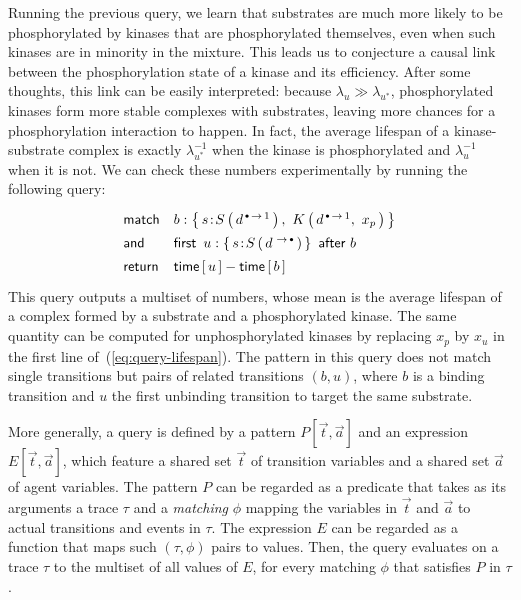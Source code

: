 \documentclass[runningheads]{llncs}
\begin{document}
Running the previous query, we learn that substrates are much more
likely to be phosphorylated by kinases that are phosphorylated
themselves, even when such kinases are in minority in the mixture.
This leads us to conjecture a causal link between the phosphorylation
state of a kinase and its efficiency. After some thoughts, this link
can be easily interpreted: because $\lambda_u \gg \lambda_{u^*}$,
phosphorylated kinases form more stable complexes with substrates,
leaving more chances for a phosphorylation interaction to happen.  In
fact, the average lifespan of a kinase-substrate complex is exactly
$\lambda_{u^*}^{-1}$ when the kinase is phosphorylated and
$\lambda_u^{-1}$ when it is not. We can check these numbers
experimentally by running the following query:
\begin{equation}\label{eq:query-lifespan}
  \Query{
    \m{match} & 
    b:\Set{ \iAG{s}{S}{d^{\Trans{\Free}{1}}}, \ 
      \AG{K}{d^{\Trans{\Free}{1}}, \ x_{p}} } \\
    \m{and} &
    \FirstAfter{u:\Set{ \iAG{s}{S}{d^{\Trans{}{\Free}}} }}{b} \\
    \m{return} & 
    \Time{u} - \Time{b}
  }
\end{equation}
This query outputs a multiset of numbers, whose mean is the average
lifespan of a complex formed by a substrate and a phosphorylated
kinase. The same quantity can be computed for unphosphorylated kinases
by replacing $x_p$ by $x_u$ in the first line
of~(\ref{eq:query-lifespan}).  The pattern in this query does not
match single transitions but pairs of related transitions $(b, u)$,
where $b$ is a binding transition and $u$ the first unbinding
transition to target the same substrate.

\iffalse
\begin{equation}\label{eq:query-kinase-efficiency}
  \Query{
    \m{match} & 
    b:\Set{ \iAG{s}{S}{x_u,\ d^{\Trans{\Free}{1}}}, \ 
      \iAG{k}{K}{d^{\Trans{\Free}{1}}} } \\
    \m{and} &
    \FirstAfter{u:\Set{ \iAG{s}{S}{d^{\Trans{}{\Free}}} }}{b} \\
    \m{return} & 
    \IntState{\StateBefore{b}}{k}{\STR{x}}, \ 
    \IntState{\StateAfter{u}}{s}{\STR{x}}
  }
\end{equation}
\fi

\bigskip

More generally, a query is defined by a {pattern}
$P[\Vec{t}, \Vec{a}]$ and an {expression} $E[\Vec{t}, \Vec{a}]$, which
feature a shared set $\Vec{t}$ of transition variables and a shared
set $\Vec{a}$ of agent variables. The pattern $P$ can be regarded as a
predicate that takes as its arguments a trace $\tau$ and a
\emph{matching} $\phi$ mapping the variables in $\Vec{t}$ and
$\Vec{a}$ to actual transitions and events in $\tau$.  The expression
$E$ can be regarded as a function that maps such $(\tau, \phi)$ pairs
to values. Then, the query evaluates on a trace $\tau$ to the multiset
of all values of $E$, for every matching $\phi$ that satisfies $P$ in
$\tau$.
\end{document}
